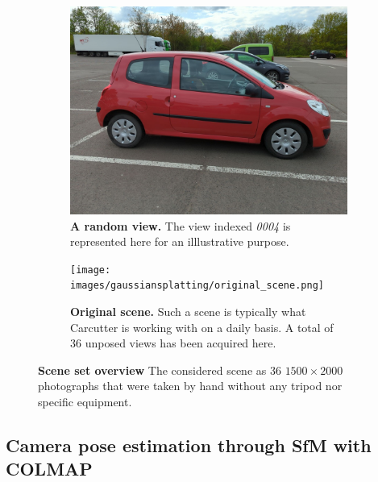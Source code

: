 \begin{figure}[htb!]
  \centering
  \begin{subfigure}[b]{0.45\linewidth}
    \includegraphics[width=\linewidth]{images/gaussiansplatting/gt/img-4.jpg}
    \caption{\textbf{A random view.} The view indexed \textit{0004} is represented here for an illlustrative purpose. }
    \label{fig:view-idx-4}
  \end{subfigure}
  \quad %
  \begin{subfigure}[b]{0.45\linewidth}
    \texttt{[image: images/gaussiansplatting/original\_scene.png]}
    \caption{\textbf{Original scene.} Such a scene is typically what Carcutter is working with on a daily basis. A total of 36 unposed views has been acquired here. }
    \label{fig:gs-original_scene}
  \end{subfigure}
  \caption{\textbf{Scene set overview} The considered scene as 36 $1500\times2000$ photographs that were taken by hand without any tripod nor specific equipment. }
  \label{fig:gs-scene-dataset}
\end{figure}

\subsection{Camera pose estimation through SfM with COLMAP}
\label{subsec:gs-sfm}

